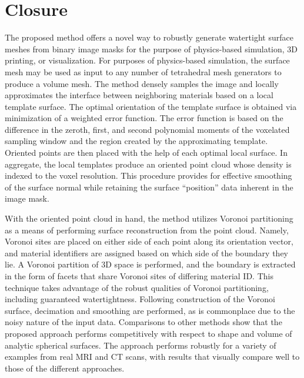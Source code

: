 \section{Closure}

The proposed method offers a novel way to robustly generate watertight surface meshes from binary image masks for the purpose of physics-based simulation, 3D printing, or visualization. For purposes of physics-based simulation, the surface mesh may be used as input to any number of tetrahedral mesh generators to produce a volume mesh. The method densely samples the image and locally approximates the interface between neighboring materials based on a local template surface. The optimal orientation of the template surface is obtained via minimization of a weighted error function. The error function is based on the difference in the zeroth, first, and second polynomial moments of the voxelated sampling window and the region created by the approximating template. Oriented points are then placed with the help of each optimal local surface. In aggregate, the local templates produce an oriented point cloud whose density is indexed to the voxel resolution. This procedure provides for effective smoothing of the surface normal while retaining the surface ``position'' data inherent in the image mask.

With the oriented point cloud in hand, the method utilizes Voronoi partitioning as a means of performing surface reconstruction from the point cloud. Namely, Voronoi sites are placed on either side of each point along its orientation vector, and material identifiers are assigned based on which side of the boundary they lie. A Voronoi partition of 3D space is performed, and the boundary is extracted in the form of facets that share Voronoi sites of differing material ID. This technique takes advantage of the robust qualities of Voronoi partitioning, including guaranteed watertightness. Following construction of the Voronoi surface, decimation and smoothing are performed, as is commonplace due to the noisy nature of the input data. Comparisons to {other methods} show that the proposed approach performs competitively with respect to shape and volume of analytic spherical surfaces. The approach performs robustly for a variety of examples from real MRI and CT scans, with results that visually compare well to those of the {different approaches}.

